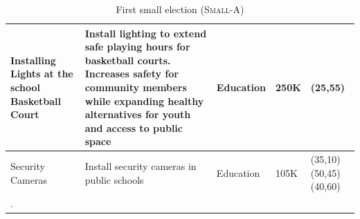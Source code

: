\documentclass{comsoc2023}
\begin{document}
\begin{longtable}[ht!]{|p{2cm}|p{6cm}|p{3cm}|p{1cm}|p{2.5cm}|}
    \hline
    Installing Lights at the school Basketball Court & Install lighting to extend safe playing hours for basketball courts. Increases safety for community members while expanding healthy alternatives for youth and access to public space & Education & 250K & (25,55)\\
    \hline
    Security Cameras & Install security cameras in public schools & Education & 105K & (35,10) (50,45) (40,60)\\
        
     \hline
  \caption{First small election (\textsc{Small-A})}\label{tab:first_elc}.
\end{longtable}

\end{document}
